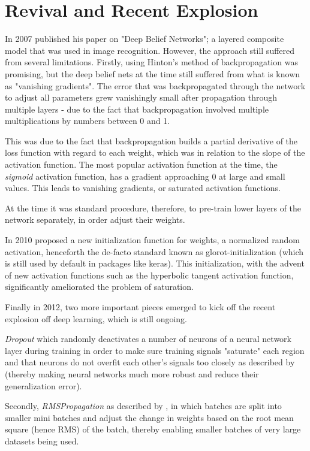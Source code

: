 \chapter{Revival and Recent Explosion}

In 2007 \cite{hinton2009deep} published his paper on "Deep Belief Networks"; a layered composite model that was used in image recognition. 
However, the approach still suffered from several limitations. Firstly, using Hinton's method of backpropagation was promising, but the deep belief nets at the time still suffered from what is known as "vanishing gradients". The error that was backpropagated through the network to adjust all parameters grew vanishingly small after propagation through multiple layers - due to the fact that backpropagation involved multiple multiplications by numbers between 0 and 1.

This was due to the fact that backpropagation builds a partial derivative of the loss function with regard to each weight, which was in relation to the slope of the activation function. The most popular activation function at the time, the \textit{sigmoid} activation function, has a gradient approaching 0 at large and small values. This leads to vanishing gradients, or saturated activation functions.

At the time it was standard procedure, therefore, to pre-train lower layers of the network separately, in order adjust their weights.

In 2010 \cite{glorot2010understanding} proposed a new initialization function for weights, a normalized random activation, henceforth the de-facto standard known as glorot-initialization (which is still used by default in packages like keras). This initialization, with the advent of new activation functions such as the hyperbolic tangent activation function, significantly ameliorated the problem of saturation.

Finally in 2012, two more important pieces emerged to kick off the recent explosion off deep learning, which is still ongoing. 

\textit{Dropout} which randomly deactivates a number of neurons of a neural network layer during training in order to make sure training signals "saturate" each region and that neurons do not overfit each other's signals too closely as described by \cite{dropout} (thereby making neural networks much more robust and reduce their generalization error).

Secondly, \textit{RMSPropagation} as described by \cite{RMSPROP}, in which batches are split into smaller mini batches and adjust the change in weights based on the root mean square (hence RMS) of the batch, thereby enabling smaller batches of very large datasets being used. 

